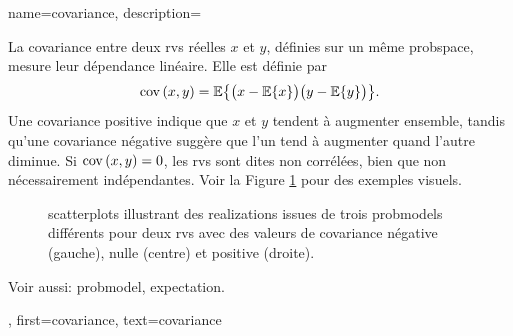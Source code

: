 {
	name={covariance},
	description={
		La covariance entre deux \glspl{rv} réelles $x$ et $y$, définies sur un même \gls{probspace}, mesure leur dépendance linéaire. Elle est définie par
		$$
		{\rm cov}\left(x,y\right) = \mathbb{E}\big\{ \big(x - \mathbb{E}\{ x\} \big)\big(y - \mathbb{E}\{y\} \big)\big\}.
		$$
		Une covariance positive indique que $x$ et $y$ tendent à augmenter ensemble, tandis qu’une covariance négative suggère que l’un tend à augmenter quand l’autre diminue. 
		Si ${\rm cov}\left(x,y\right) = 0$, les \glspl{rv} sont dites non corrélées, bien que non nécessairement indépendantes.
		Voir la Figure \ref{fig:covariance-examples_dict} pour des exemples visuels.
		\begin{figure}[H]
			\caption{\Glspl{scatterplot} illustrant des \glspl{realization} issues de trois \glspl{probmodel} différents pour deux \glspl{rv} avec des valeurs de covariance négative (gauche), nulle (centre) et positive (droite).}
			\label{fig:covariance-examples_dict}
		\end{figure}
	Voir aussi: \gls{probmodel}, \gls{expectation}.
	},
	first={covariance},
	text={covariance}
}

